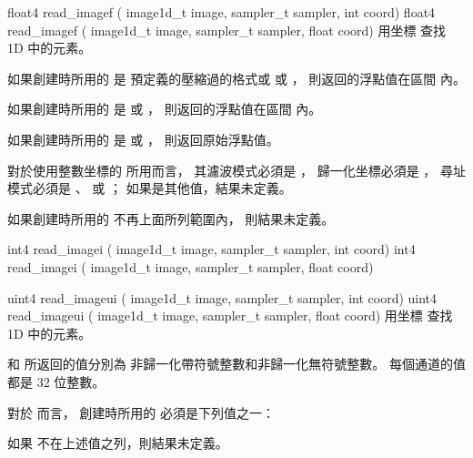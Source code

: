float4 read_imagef (
	image1d_t image,
	sampler_t sampler,
	int coord)
float4 read_imagef (
	image1d_t image,
	sampler_t sampler,
	float coord)
\stopbuffer
{}
用坐標  查找 1D   中的元素。

如果創建時所用的  是
預定義的壓縮過的格式或  或 ，
則返回的浮點值在區間 \math{[0.0 \cdots 1.0]} 內。

如果創建時所用的  是
  或 ，
則返回的浮點值在區間 \math{[-1.0 \cdots 1.0]} 內。

如果創建時所用的  是
  或 ，
則返回原始浮點值。

對於使用整數坐標的  所用而言，
其濾波模式必須是 ，
歸一化坐標必須是 ，
尋址模式必須是 、 
 或 ；
如果是其他值，結果未定義。

如果創建時所用的  不再上面所列範圍內，
則結果未定義。
\stopbuffer

int4 read_imagei (
	image1d_t image,
	sampler_t sampler,
	int coord)
int4 read_imagei (
	image1d_t image,
	sampler_t sampler,
	float coord)

uint4 read_imageui (
	image1d_t image,
	sampler_t sampler,
	int coord)
uint4 read_imageui (
	image1d_t image,
	sampler_t sampler,
	float coord)
\stopbuffer
{}
用坐標  查找 1D   中的元素。

 和  所返回的值分別為
非歸一化帶符號整數和非歸一化無符號整數。
每個通道的值都是 32 位整數。

對於  而言，
創建時所用的  必須是下列值之一：
\startigBase[indentnext=no]
\item {}
\item {}
\item {}
\stopigBase
如果  不在上述值之列，則結果未定義。


